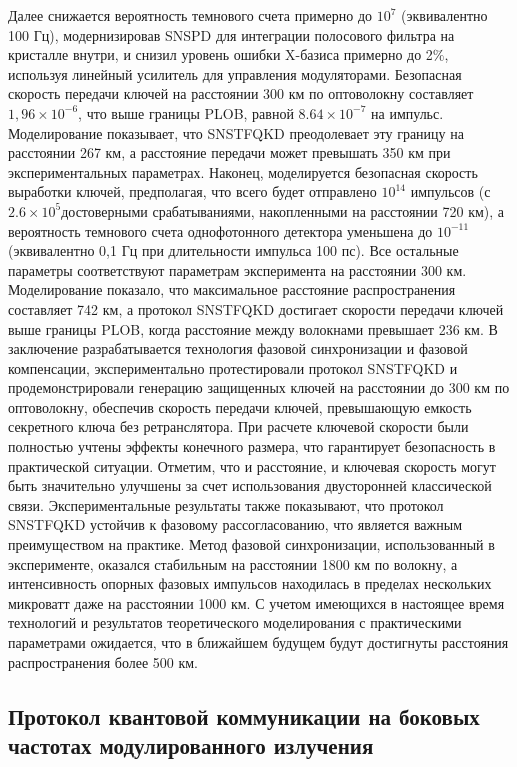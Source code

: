  Далее снижается вероятность темнового счета примерно до $10^7$ (эквивалентно 100 Гц), модернизировав SNSPD для интеграции полосового фильтра на кристалле внутри, и снизил уровень ошибки X-базиса примерно до 2$\%$, используя линейный усилитель для управления модуляторами. Безопасная скорость передачи ключей на расстоянии 300 км по оптоволокну составляет $1,96 × 10^{-6}$, что выше границы PLOB, равной $8.64 × 10^{-7}$ на импульс. Моделирование показывает, что SNSTFQKD преодолевает эту границу на расстоянии 267 км, а расстояние передачи может превышать 350 км при экспериментальных параметрах. Наконец, моделируется безопасная скорость выработки ключей, предполагая, что всего будет отправлено $10^{14}$ импульсов (с $2.6 × 10^5$достоверными срабатываниями, накопленными на расстоянии 720 км), а вероятность темнового счета однофотонного детектора уменьшена до $10^{-11}$ (эквивалентно 0,1 Гц при длительности импульса 100 пс). Все остальные параметры соответствуют параметрам эксперимента на расстоянии 300 км. Моделирование показало, что максимальное расстояние распространения составляет 742 км, а протокол SNSTFQKD достигает скорости передачи ключей выше границы PLOB, когда расстояние между волокнами превышает 236 км. В заключение разрабатывается технология фазовой синхронизации и фазовой компенсации, экспериментально протестировали протокол SNSTFQKD и продемонстрировали генерацию защищенных ключей на расстоянии до 300 км по оптоволокну, обеспечив скорость передачи ключей, превышающую емкость секретного ключа без ретранслятора. При расчете ключевой скорости были полностью учтены эффекты конечного размера, что гарантирует безопасность в практической ситуации. Отметим, что и расстояние, и ключевая скорость могут быть значительно улучшены за счет использования двусторонней классической связи. Экспериментальные результаты также показывают, что протокол SNSTFQKD устойчив к фазовому рассогласованию, что является важным преимуществом на практике. Метод фазовой синхронизации, использованный в эксперименте, оказался стабильным на расстоянии 1800 км по волокну, а интенсивность опорных фазовых импульсов находилась в пределах нескольких микроватт даже на расстоянии 1000 км. С учетом имеющихся в настоящее время технологий и результатов теоретического моделирования с практическими параметрами ожидается, что в ближайшем будущем будут достигнуты расстояния распространения более 500 км.


\subsection{Протокол квантовой коммуникации на боковых частотах модулированного излучения}\label{sec:ch1/sect2/subsec2}

